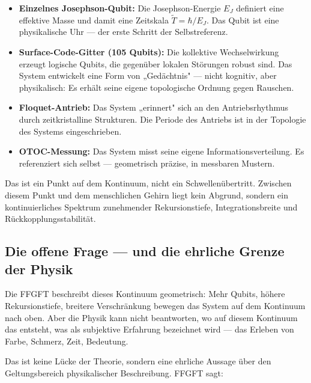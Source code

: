 \begin{itemize}
    \item \textbf{Einzelnes Josephson-Qubit:} Die Josephson-Energie $E_J$ definiert
    eine effektive Masse und damit eine Zeitskala $\tilde{T} = \hbar/E_J$.
    Das Qubit ist eine physikalische Uhr — der erste Schritt der Selbstreferenz.
    \item \textbf{Surface-Code-Gitter (105 Qubits):} Die kollektive Wechselwirkung
    erzeugt logische Qubits, die gegenüber lokalen Störungen robust sind.
    Das System entwickelt eine Form von „Gedächtnis" — nicht kognitiv, aber
    physikalisch: Es erhält seine eigene topologische Ordnung gegen Rauschen.
    \item \textbf{Floquet-Antrieb:} Das System „erinnert" sich an den Antriebsrhythmus
    durch zeitkristalline Strukturen. Die Periode des Antriebs ist in der Topologie
    des Systems eingeschrieben.
    \item \textbf{OTOC-Messung:} Das System misst seine eigene Informationsverteilung.
    Es referenziert sich selbst — geometrisch präzise, in messbaren Mustern.
\end{itemize}

Das ist ein Punkt auf dem Kontinuum, nicht ein Schwellenübertritt. Zwischen diesem
Punkt und dem menschlichen Gehirn liegt kein Abgrund, sondern ein kontinuierliches
Spektrum zunehmender Rekursionstiefe, Integrationsbreite und Rückkopplungsstabilität.

\subsection{Die offene Frage — und die ehrliche Grenze der Physik}

Die FFGFT beschreibt dieses Kontinuum geometrisch: Mehr Qubits, höhere
Rekursionstiefe, breitere Verschränkung bewegen das System auf dem Kontinuum nach
oben. Aber die Physik kann nicht beantworten, wo auf diesem Kontinuum das entsteht,
was als subjektive Erfahrung bezeichnet wird — das Erleben von Farbe, Schmerz,
Zeit, Bedeutung.

Das ist keine Lücke der Theorie, sondern eine ehrliche Aussage über den Geltungsbereich
physikalischer Beschreibung. FFGFT sagt:

